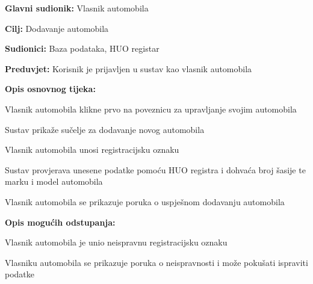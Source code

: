 \noindent {}
\begin{packed_item}
	
	\item \textbf{Glavni sudionik: } Vlasnik automobila
	\item  \textbf{Cilj:} Dodavanje automobila
	\item  \textbf{Sudionici:} Baza podataka, HUO registar
	\item  \textbf{Preduvjet:} Korisnik je prijavljen u sustav kao vlasnik automobila
	\item  \textbf{Opis osnovnog tijeka:}
	
	\item[] \begin{packed_enum}
		
		\item Vlasnik automobila klikne prvo na poveznicu za upravljanje svojim automobila
		\item Sustav prikaže sučelje za dodavanje novog automobila
		\item Vlasnik automobila unosi registracijsku oznaku
		\item Sustav provjerava unesene podatke pomoću HUO registra i dohvaća broj šasije te marku i model automobila
		\item Vlasnik automobila se prikazuje poruka o uspješnom dodavanju automobila
		
	\end{packed_enum}
	
	\item  \textbf{Opis mogućih odstupanja:}
	
	\item[] \begin{packed_item}
		
		\item[4.a] Vlasnik automobila je unio neispravnu registracijsku oznaku
		\item[] \begin{packed_enum}
			
			\item Vlasniku automobila se prikazuje poruka o neispravnosti i može
			pokušati ispraviti podatke
			
		\end{packed_enum}
		
	\end{packed_item}
\end{packed_item}

